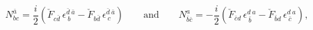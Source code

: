\begin{equation}
N^{\bar{a}}_{bc} = \frac{i}{2} 
 \left( \check{F}_{c\bar{d}}\, \epsilon^{\bar{d}~\bar{a}}_{~b}
       -\check{F}_{b\bar{d}}\, \epsilon^{\bar{d}~\bar{a}}_{~c} \right)
\qquad \mbox{and} \qquad
N^{a}_{\bar{b}\bar{c}} = -\frac{i}{2} 
 \left( \check{F}_{\bar{c}d}\, \epsilon^{d~a}_{~\bar{b}}
       -\check{F}_{\bar{b}d}\, \epsilon^{d~a}_{~\bar{c}} \right)
     , \label{Nijenhuis.hol}
\end{equation}

